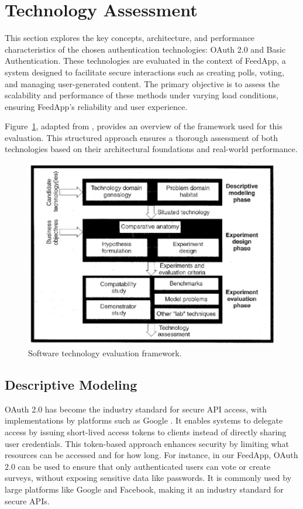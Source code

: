 \section{Technology Assessment}
\label{sec:technology}

This section explores the key concepts, architecture, and performance characteristics of the chosen authentication technologies: OAuth 2.0 and Basic Authentication. These technologies are evaluated in the context of FeedApp, a system designed to facilitate secure interactions such as creating polls, voting, and managing user-generated content. The primary objective is to assess the scalability and performance of these methods under varying load conditions, ensuring FeedApp's reliability and user experience.

Figure~\ref{fig:framework}, adapted from \cite{brown:96}, provides an overview of the framework used for this evaluation. This structured approach ensures a thorough assessment of both technologies based on their architectural foundations and real-world performance.

\begin{figure}[thb]
	\centering
	\includegraphics[scale=0.5]{figs/framework.png}
	\caption{Software technology evaluation framework.}
	\label{fig:framework}
\end{figure}

\subsection{Descriptive Modeling}
OAuth 2.0 has become the industry standard for secure API access, with implementations by platforms such as Google \cite{oauthnet,google:oauth}. It enables systems to delegate access by issuing short-lived access tokens to clients instead of directly sharing user credentials. This token-based approach enhances security by limiting what resources can be accessed and for how long. For instance, in our FeedApp, OAuth 2.0 can be used to ensure that only authenticated users can vote or create surveys, without exposing sensitive data like passwords. It is commonly used by large platforms like Google and Facebook, making it an industry standard for secure APIs.

